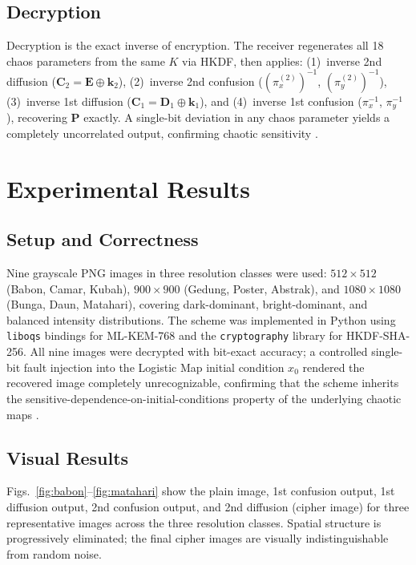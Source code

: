 \documentclass[conference]{IEEEtran}
\begin{document}
\subsection{Decryption}

Decryption is the exact inverse of encryption. The receiver regenerates all 18 chaos parameters from the same $K$ via HKDF, then applies: (1)~inverse 2nd diffusion ($\mathbf{C}_2 = \mathbf{E}\oplus\mathbf{k}_2$), (2)~inverse 2nd confusion ($(\pi_x^{(2)})^{-1}$, $(\pi_y^{(2)})^{-1}$), (3)~inverse 1st diffusion ($\mathbf{C}_1 = \mathbf{D}_1\oplus\mathbf{k}_1$), and (4)~inverse 1st confusion ($\pi_x^{-1}$, $\pi_y^{-1}$), recovering $\mathbf{P}$ exactly. A single-bit deviation in any chaos parameter yields a completely uncorrelated output, confirming chaotic sensitivity \cite{b28,b30}.

\section{Experimental Results}

\subsection{Setup and Correctness}

Nine grayscale PNG images in three resolution classes were used: $512\!\times\!512$ (Babon, Camar, Kubah), $900\!\times\!900$ (Gedung, Poster, Abstrak), and $1080\!\times\!1080$ (Bunga, Daun, Matahari), covering dark-dominant, bright-dominant, and balanced intensity distributions. The scheme was implemented in Python using \texttt{liboqs} bindings for ML-KEM-768 and the \texttt{cryptography} library for HKDF-SHA-256. All nine images were decrypted with bit-exact accuracy; a controlled single-bit fault injection into the Logistic Map initial condition $x_0$ rendered the recovered image completely unrecognizable, confirming that the scheme inherits the sensitive-dependence-on-initial-conditions property of the underlying chaotic maps \cite{b28,b30}.

\subsection{Visual Results}

Figs.~\ref{fig:babon}--\ref{fig:matahari} show the plain image, 1st confusion output, 1st diffusion output, 2nd confusion output, and 2nd diffusion (cipher image) for three representative images across the three resolution classes. Spatial structure is progressively eliminated; the final cipher images are visually indistinguishable from random noise.
\end{document}
